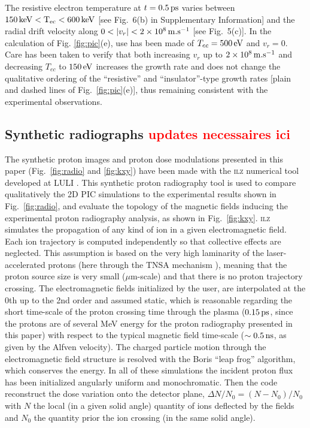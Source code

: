 \documentclass[aps,twocolumn,showpacs,superscriptaddress]{revtex4}
\begin{document}
The resistive electron temperature at $t=0.5\,\rm ps$ varies between $150\,\rm keV <T_{ec} < 600\,\rm keV$ [see Fig.~6(b) in Supplementary Information] and the radial drift velocity along $0< \vert v_r \vert <2\times 10^8 \,\rm m.s^{-1}$ [see Fig.~5(c)]. 
In the calculation of Fig. \ref{fig:pic}(e), use has been made of $T_{ec}=500\,\rm eV$ and $v_r = 0$.
Care has been taken to verify that both increasing $v_r$ up to $2\times 10^8 \,\rm m.s^{-1}$ and decreasing $T_{ec}$ to $150\,\rm eV$ increases the growth rate and does not change the qualitative ordering of the ``resistive'' and ``insulator''-type growth rates [plain and dashed lines of Fig.~\ref{fig:pic}(e)], thus remaining consistent with the experimental observations.

\subsection*{Synthetic radiographs \textcolor{red}{updates necessaires ici}}
The synthetic proton images and proton dose modulations presented in this paper (Fig.~\ref{fig:radio} and  \ref{fig:kxy}) have been made with the \textsc{ilz} numerical tool developed at LULI \cite{PHD_Riquier}. This synthetic proton radiography tool is used to compare qualitatively the 2D PIC simulations to the experimental results shown in Fig.~\ref{fig:radio}, and evaluate the topology of the magnetic fields inducing the experimental proton radiography analysis, as shown in Fig.~\ref{fig:kxy}.
\textsc{ilz} simulates the propagation of any kind of ion in a given electromagnetic field. Each ion trajectory is computed independently so that collective effects are neglected. This assumption is based on the very high laminarity of the laser-accelerated protons \cite{PRL_Cowan_2004} (here through the TNSA mechanism \cite{RMP_Macchi_2013}), meaning that the proton source size is very small ($\mu$m-scale) and that there is no proton trajectory crossing. The electromagnetic  fields   initialized by the user, are interpolated at the 0th up to the 2nd order and assumed static, which is reasonable regarding the short time-scale of the proton crossing time through the plasma ($0.15\,\rm ps$, since the protons are of several MeV energy for the proton radiography presented in this paper) with respect to the typical magnetic field time-scale ($\sim 0.5\,\rm ns$, as given by the Alfven velocity). The charged particle motion through the electromagnetic  field structure is resolved with the Boris “leap frog” algorithm, which conserves the energy. In all of these simulations the incident proton flux has been initialized angularly uniform and monochromatic. Then the code reconstruct the dose variation onto the detector plane, $\Delta N/N_0= (N- N_0)/N_0$ with $N$ the local (in a given solid angle) quantity of ions deflected by the fields and $N_0$ the quantity prior the ion crossing  (in the same solid angle). 
\end{document}
